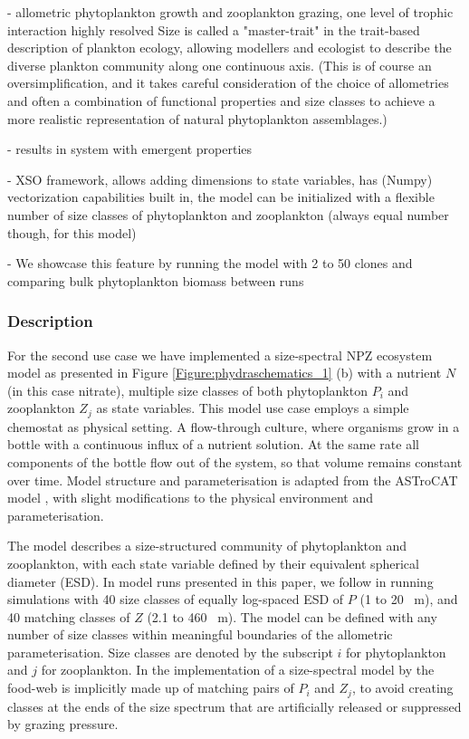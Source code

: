 \documentclass[journal abbreviation, manuscript]{copernicus}
\begin{document}
- allometric phytoplankton growth and zooplankton grazing, one level of trophic interaction highly resolved
Size is called a "master-trait" in the trait-based description of plankton ecology, allowing modellers and ecologist to describe the diverse plankton community along one continuous axis. (This is of course an oversimplification, and it takes careful consideration of the choice of allometries and often a combination of functional properties and size classes to achieve a more realistic representation of natural phytoplankton assemblages.)

- results in system with emergent properties

- XSO framework, allows adding dimensions to state variables, has (Numpy) vectorization capabilities built in, the model can be initialized with a flexible number of size classes of phytoplankton and zooplankton (always equal number though, for this model)

- We showcase this feature by running the model with 2 to 50 clones and comparing bulk phytoplankton biomass between runs



\subsubsection{Description}

For the second use case we have implemented a size-spectral NPZ ecosystem model as presented in Figure \ref{Figure:phydraschematics_1} (b) with a nutrient $N$ (in this case nitrate), multiple size classes of both phytoplankton $P_i$ and zooplankton $Z_j$ as state variables. 
This model use case employs a simple chemostat as physical setting. A flow-through culture, where organisms grow in a bottle with a continuous influx of a nutrient solution. At the same rate all components of the bottle flow out of the system, so that volume remains constant over time.
Model structure and parameterisation is adapted from the ASTroCAT model \citep{Banas2011b}, with slight modifications to the physical environment and parameterisation. 

The model describes a size-structured community of phytoplankton and zooplankton, with each state variable defined by their equivalent spherical diameter (ESD). In model runs presented in this paper, we follow \citet{Banas2011b} in running simulations with 40 size classes of equally log-spaced ESD of $P$ (1 to 20 \unit{\mu m}), and 40 matching classes of $Z$ (2.1 to 460  \unit{\mu m}). 
The model can be defined with any number of size classes within meaningful boundaries of the allometric parameterisation. Size classes are denoted by the subscript $i$ for phytoplankton and $j$ for zooplankton. In the implementation of a size-spectral model by \citeauthor{Banas2011b} the food-web is implicitly made up of matching pairs of $P_i$ and $Z_j$, to avoid creating classes at the ends of the size spectrum that are artificially released or suppressed by grazing pressure.
\end{document}

